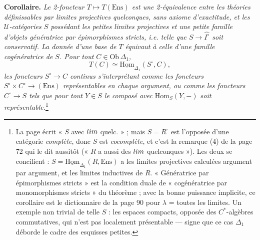 \documentclass[11pt,a4paper]{article}
\begin{document}
\textbf{Corollaire.} \emph{Le 2-foncteur $T \mapsto T(\mathrm{Ens})$ est une
2-équivalence entre les théories définissables par limites projectives
quelconques, sans axiome d'exactitude, et les $\mathcal{U}$-catégories $S$
possédant les petites limites projectives et une petite famille d'objets
génératrice par épimorphismes stricts, i.e. telle que $S \to
\widehat{I^{\circ}}$ soit conservatif. La donnée d'une base de $T$ équivaut
à celle d'une famille cogénératrice de $S$. Pour tout $C \in \mathrm{Ob}\,
\Delta_{1}$,}
\[
T(C) \simeq \underline{\mathrm{Hom}}_{\Delta_{1}}(S^{\circ}, C),
\]
\emph{les foncteurs $S^{\circ} \to C$ continus s'interprétant comme les
foncteurs $S^{\circ} \times C^{\circ} \to (\mathrm{Ens})$ représentables en
chaque argument, ou comme les foncteurs $C^{\circ} \to S$ tels que pour tout
$Y \in S$ le composé avec $\mathrm{Hom}_{S}(Y, -)$ soit
représentable.}\footnote{La page écrit « $S$ avec $\varprojlim$ quelc. » ;
mais $S = R^{\circ}$ est l'opposée d'une catégorie \emph{complète}, donc
$S$ est \emph{cocomplète}, et c'est la remarque (4) de la page 72 qui le
dit aussitôt (« $R$ a aussi des $\varinjlim$ quelconques »). Les deux se
concilient : $S = \underline{\mathrm{Hom}}_{\Delta_{1}}(R, \mathrm{Ens})$ a
les limites projectives calculées argument par argument, et les limites
inductives de $R$. « Génératrice par épimorphismes stricts » est la
condition duale de « cogénératrice par monomorphismes stricts » du
théorème ; avec la bonne puissance implicite, ce corollaire est le
dictionnaire de la page 90 pour $\lambda$ = toutes les limites. Un
exemple non trivial de telle $S$ : les espaces compacts, opposée des
$C^{*}$-algèbres commutatives, qui n'est pas localement présentable —
signe que ce cas $\Delta_{1}$ déborde le cadre des esquisses petites.}
\end{document}
